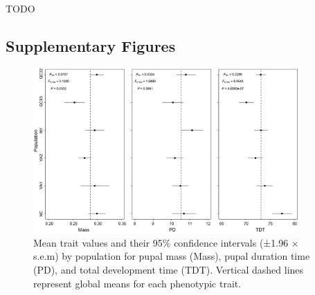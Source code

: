 \documentclass[smallextended]{svjour3}
\begin{document}
TODO


%

\subsection*{Supplementary Figures}\label{ss:sfig}

\begin{figure}[h]
\centering
\includegraphics[width=0.9\textwidth]{media/image1.png}
\caption{Mean trait values and their 95\% confidence
intervals (±1.96 × s.e.m) by population for pupal mass (Mass), pupal
duration time (PD), and total development time (TDT). Vertical dashed
lines represent global means for each phenotypic trait.}
\label{fig:trait}
\end{figure}

\newpage
\end{document}
